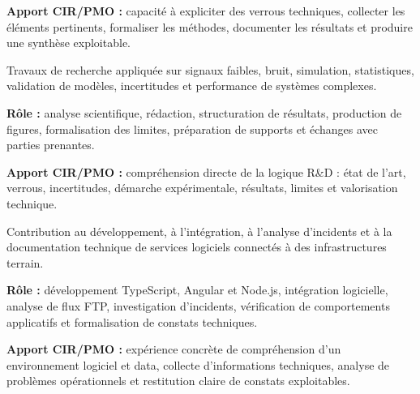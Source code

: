 \documentclass[8pt,a4paper,ragged2e,withhyper]{altacv}
\begin{document}
\textbf{Apport CIR/PMO :} capacité à expliciter des verrous techniques, collecter les éléments pertinents, formaliser les méthodes, documenter les résultats et produire une synthèse exploitable.

\divider


Travaux de recherche appliquée sur signaux faibles, bruit, simulation, statistiques, validation de modèles, incertitudes et performance de systèmes complexes.

\textbf{Rôle :} analyse scientifique, rédaction, structuration de résultats, production de figures, formalisation des limites, préparation de supports et échanges avec parties prenantes.

\textbf{Apport CIR/PMO :} compréhension directe de la logique R\&D : état de l’art, verrous, incertitudes, démarche expérimentale, résultats, limites et valorisation technique.

\divider


Contribution au développement, à l’intégration, à l’analyse d’incidents et à la documentation technique de services logiciels connectés à des infrastructures terrain.

\textbf{Rôle :} développement TypeScript, Angular et Node.js, intégration logicielle, analyse de flux FTP, investigation d’incidents, vérification de comportements applicatifs et formalisation de constats techniques.

\textbf{Apport CIR/PMO :} expérience concrète de compréhension d’un environnement logiciel et data, collecte d’informations techniques, analyse de problèmes opérationnels et restitution claire de constats exploitables.


\vspace{-.3cm}

{\small
{}
}
\end{document}
